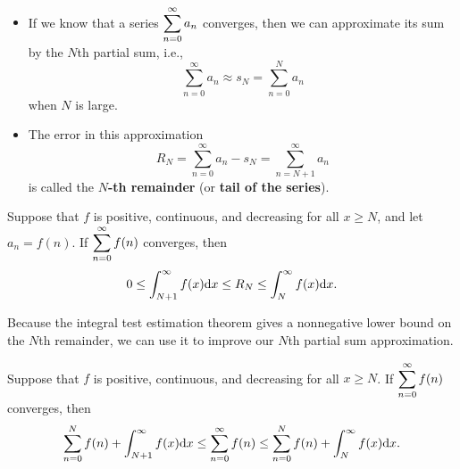 \newpage

\begin{remark}\,
\begin{itemize}
\item If we know that a series $\displaystyle\sum_{n=0}^\infty a_n$ converges, then we can approximate its sum by the $N$th partial sum, i.e., 
\begin{equation*}
\sum_{n=0}^\infty a_n \approx s_N = \sum_{n=0}^N a_n
\end{equation*}
when $N$ is large.
\item The error in this approximation 
\begin{equation*}
R_N = \sum_{n=0}^\infty a_n - s_N = \sum_{n=N+1}^\infty a_n
\end{equation*}
is called the \textbf{$N$-th remainder} (or \textbf{tail of the series}).
\end{itemize}
\end{remark}

\begin{theorem}
Suppose that $f$ is positive, continuous, and decreasing for all $x\ge N$, and let $a_n=f(n)$.
If $\displaystyle\sum_{n=0}^\infty f(n)$ converges, then 
\begin{equation*}
0\le  \int_{N+1}^\infty f(x)\mathrm{d} x\le R_N\le \int_{N}^\infty f(x)\mathrm{d} x.
\end{equation*}
\end{theorem}

\vfill

\begin{remark}
Because the integral test estimation theorem gives a nonnegative lower bound on the $N$th remainder, we can use it to improve our $N$th partial sum approximation.
\end{remark}

\begin{corollary}
Suppose that $f$ is positive, continuous, and decreasing for all $x\ge N$.
If $\displaystyle\sum_{n=0}^\infty f(n)$ converges, then 
\begin{equation*}
\sum_{n=0}^Nf(n) +  \int_{N+1}^\infty f(x)\mathrm{d} x\le \sum_{n=0}^\infty f(n)\le \sum_{n=0}^Nf(n) +  \int_{N}^\infty f(x)\mathrm{d} x.
\end{equation*}
\end{corollary}

\newpage

